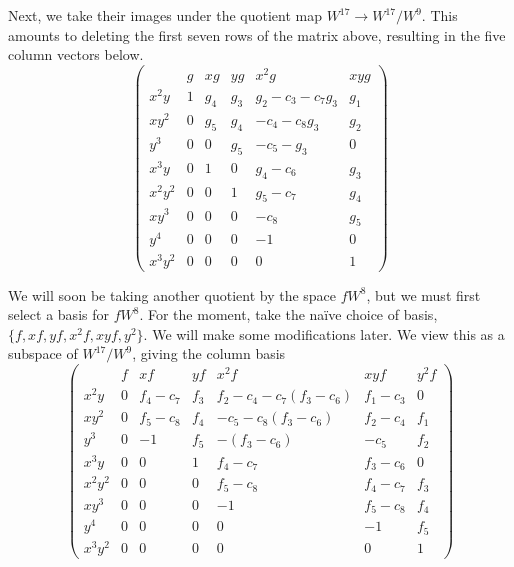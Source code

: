 Next, we take their images under the quotient map $W^{17} \to W^{17}/W^9$.
This amounts to deleting the first seven rows of the matrix above,
resulting in the five column vectors below.
\[ \left( \begin{array}{r|rrrrr}
         &   g & xg & yg & x^2g & xyg \\
  \hline
  x^2y   &   1 & g_4 & g_3 & g_2 - c_3 - c_7g_3 & g_1 \\
  x  y^2 &   0 & g_5 & g_4 &     - c_4 - c_8g_3 & g_2 \\
     y^3 &   0 &   0 & g_5 &     - c_5    - g_3 &   0 \\
  x^3y   &   0 &   1 &   0 & g_4 - c_6          & g_3 \\ 
  x^2y^2 &   0 &   0 &   1 & g_5 - c_7          & g_4 \\ 
  x  y^3 &   0 &   0 &   0 &     - c_8          & g_5 \\
     y^4 &   0 &   0 &   0 &       - 1          &   0 \\
  x^3y^2 &   0 &   0 &   0 &         0          &   1
\end{array} \right) \]

We will soon be taking another quotient by the space $fW^8$,
but we must first select a basis for $fW^8$.
For the moment, take the na\"ive choice of basis, $\{f, xf, yf, x^2f, xyf, y^2\}$.
We will make some modifications later.
We view this as a subspace of $W^{17}/W^9$, giving the column basis
\[ \left( \begin{array}{r|rrrrrr}
         & f &        xf &  yf &                       x^2f &       xyf & y^2f \\
  \hline
  x^2y   & 0 & f_4 - c_7 & f_3 & f_2 - c_4 - c_7(f_3 - c_6) & f_1 - c_3 &   0 \\
  x  y^2 & 0 & f_5 - c_8 & f_4 &     - c_5 - c_8(f_3 - c_6) & f_2 - c_4 & f_1 \\
     y^3 & 0 &       - 1 & f_5 &              - (f_3 - c_6) &     - c_5 & f_2 \\
  x^3y   & 0 &         0 &   1 & f_4 - c_7                  & f_3 - c_6 &   0 \\
  x^2y^2 & 0 &         0 &   0 & f_5 - c_8                  & f_4 - c_7 & f_3 \\
  x  y^3 & 0 &         0 &   0 &       - 1                  & f_5 - c_8 & f_4 \\
     y^4 & 0 &         0 &   0 &         0                  &       - 1 & f_5 \\
  x^3y^2 & 0 &         0 &   0 &         0                  &         0 &   1
\end{array} \right) \]

